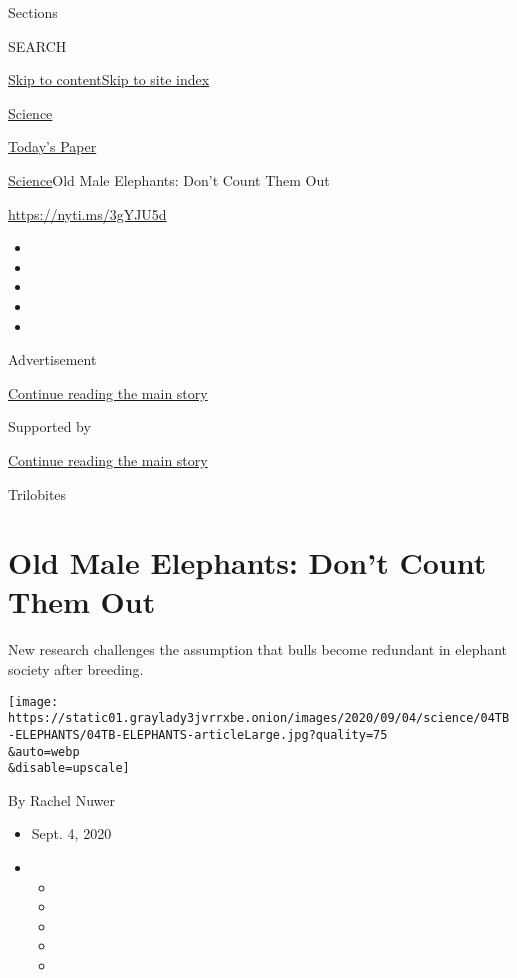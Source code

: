 Sections

SEARCH

\protect\hyperlink{site-content}{Skip to
content}\protect\hyperlink{site-index}{Skip to site index}

\href{https://www.nytimes3xbfgragh.onion/section/science}{Science}

\href{https://myaccount.nytimes3xbfgragh.onion/auth/login?response_type=cookie\&client_id=vi}{}

\href{https://www.nytimes3xbfgragh.onion/section/todayspaper}{Today's
Paper}

\href{/section/science}{Science}\textbar{}Old Male Elephants: Don't
Count Them Out

\url{https://nyti.ms/3gYJU5d}

\begin{itemize}
\item
\item
\item
\item
\item
\end{itemize}

Advertisement

\protect\hyperlink{after-top}{Continue reading the main story}

Supported by

\protect\hyperlink{after-sponsor}{Continue reading the main story}

Trilobites

\hypertarget{old-male-elephants-dont-count-them-out}{%
\section{Old Male Elephants: Don't Count Them
Out}\label{old-male-elephants-dont-count-them-out}}

New research challenges the assumption that bulls become redundant in
elephant society after breeding.

\texttt{[image: https://static01.graylady3jvrrxbe.onion/images/2020/09/04/science/04TB-ELEPHANTS/04TB-ELEPHANTS-articleLarge.jpg?quality=75\\\&auto=webp\\\&disable=upscale]}

By Rachel Nuwer

\begin{itemize}
\item
  Sept. 4, 2020
\item
  \begin{itemize}
  \item
  \item
  \item
  \item
  \item
  \end{itemize}
\end{itemize}


